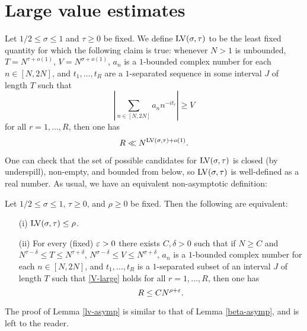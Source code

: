 \chapter{Large value estimates}

\begin{definition}\label{lv-def} Let $1/2 \leq \sigma \leq 1$ and $\tau \geq 0$ be fixed. We define $\mathrm{LV}(\sigma,\tau)$ to be the least fixed quantity for which the following claim is true: whenever $N > 1$ is unbounded, $T = N^{\tau+o(1)}$, $V = N^{\sigma+o(1)}$, $a_n$ is a $1$-bounded complex number for each $n \in [N,2N]$, and $t_1,\dots,t_R$ are a $1$-separated sequence in some interval $J$ of length $T$ such that
\begin{equation}\label{V-large}
    \left|\sum_{n \in [N,2N]} a_n n^{-it_r} \right| \geq V
\end{equation}
    for all $r=1,\dots,R$, then one has
$$ R \ll N^{\mathrm{LV}(\sigma,\tau)+o(1)}.$$
\end{definition}


One can check that the set of possible candidates for $\mathrm{LV}(\sigma,\tau)$ is closed (by underspill), non-empty, and bounded from below, so $\mathrm{LV}(\sigma,\tau)$ is well-defined as a real number.  As usual, we have an equivalent non-asymptotic definition:

\begin{lemma}\label{lv-asymp} Let $1/2 \leq \sigma \leq 1$, $\tau \geq 0$, and $\rho \geq 0$ be fixed.  Then the following are equivalent:
    \begin{itemize}
    \item[(i)] $\mathrm{LV}(\sigma,\tau) \leq \rho$.
    \item[(ii)] For every (fixed)  $\varepsilon>0$ there exists $C, \delta>0$ such that if $N \geq C$ and $N^{\tau-\delta} \leq T \leq N^{\tau+\delta}$, $N^{\sigma-\delta} \leq V \leq N^{\sigma+\delta}$, $a_n$ is a $1$-bounded complex number for each $n \in [N,2N]$, and $t_1,\dots,t_R$ is a $1$-separated subset of an interval $J$ of length $T$ such that \eqref{V-large} holds for all $r=1,\dots,R$, then one has
    $$ R \leq C N^{\rho+\varepsilon}.$$
    \end{itemize}
\end{lemma}

The proof of Lemma \ref{lv-asymp} is similar to that of Lemma \ref{beta-asymp}, and is left to the reader.


